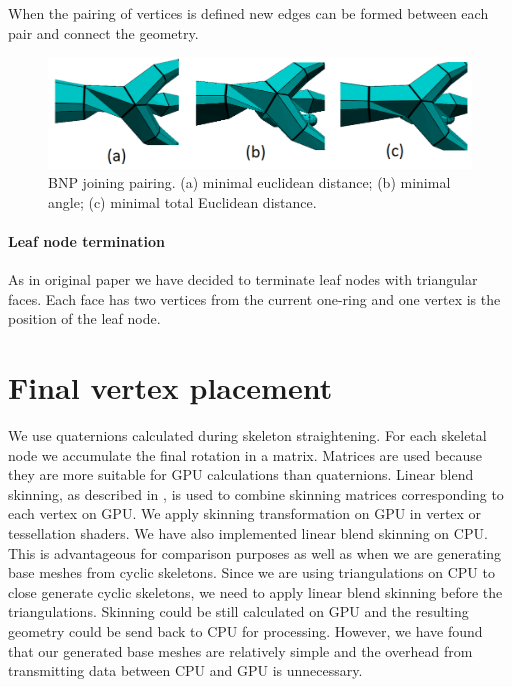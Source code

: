 When the pairing of vertices is defined new edges can be formed between each pair and connect the geometry.

\begin{figure}[h]
    \centering
    \includegraphics[width=\textwidth]{images/join_pairing.png}
    \caption[BNP joining pairing]{BNP joining pairing. (a) minimal euclidean distance; (b) minimal angle; (c) minimal total Euclidean distance.}
    \label{fig:join_pairing_ilu}
\end{figure}

\paragraph{Leaf node termination}
As in original paper \cite{sqm} we have decided to terminate leaf nodes with triangular faces. Each face has two vertices from the current one-ring and one vertex is the position of the leaf node.

\section{Final vertex placement}\label{sec:fvp}
We use quaternions calculated during skeleton straightening.
For each skeletal node we accumulate the final rotation in a matrix.
Matrices are used because they are more suitable for GPU calculations than quaternions.
Linear blend skinning, as described in \cite{Kavan-07-SDQ}, is used to combine skinning matrices corresponding to each vertex on GPU.
We apply skinning transformation on GPU in vertex or tessellation shaders.
We have also implemented linear blend skinning on CPU.
This is advantageous for comparison purposes as well as when we are generating base meshes from cyclic skeletons.
Since we are using triangulations on CPU to close generate cyclic skeletons, we need to apply linear blend skinning before the triangulations.
Skinning could be still calculated on GPU and the resulting geometry could be send back to CPU for processing. However, we have found that our generated base meshes are relatively simple and the overhead from transmitting data between CPU and GPU is unnecessary.

